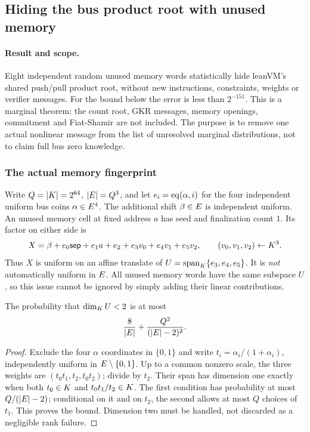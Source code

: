 \subsection{Hiding the bus product root with unused memory}\label{note:zk-bus-root}

\paragraph{Result and scope.} Eight independent random unused memory words statistically hide leanVM's shared push/pull product root, without new instructions, constraints, weights or verifier messages. For the bound below the error is less than $2^{-151}$. This is a marginal theorem: the count root, GKR messages, memory openings, commitment and Fiat-Shamir are not included. The purpose is to remove one actual nonlinear message from the list of unresolved marginal distributions, not to claim full bus zero knowledge.

\subsubsection{The actual memory fingerprint}

Write $Q=|K|=2^{64}$, $|E|=Q^3$, and let $e_i=\operatorname{eq}(\alpha,i)$ for the four independent uniform bus coins $\alpha\in E^4$. The additional shift $\beta\in E$ is independent uniform. An unused memory cell at fixed address $a$ has seed and finalization count $1$. Its factor on either side is
\[
 X=\beta+e_0\mathsf{sep}+e_1a+e_2+e_3v_0+e_4v_1+e_5v_2,
 \qquad (v_0,v_1,v_2)\gets K^3.
\]
Thus $X$ is uniform on an affine translate of $U=\operatorname{span}_{K}\{e_3,e_4,e_5\}$. It is \emph{not} automatically uniform in $E$. All unused memory words have the same subspace $U$, so this issue cannot be ignored by simply adding their linear contributions.

\begin{lemma}\label{lem:bus-dim}
The probability that $\dim_{K}U<2$ is at most
\[
 \frac8{|E|}+\frac{Q^2}{(|E|-2)^2}.
\]
\end{lemma}
\begin{proof}
Exclude the four $\alpha$ coordinates in $\{0,1\}$ and write $t_i=\alpha_i/(1+\alpha_i)$, independently uniform in $E\setminus\{0,1\}$. Up to a common nonzero scale, the three weights are $(t_0t_1,t_2,t_0t_2)$; divide by $t_2$. Their span has dimension one exactly when both $t_0\in K$ and $t_0t_1/t_2\in K$. The first condition has probability at most $Q/(|E|-2)$; conditional on it and on $t_2$, the second allows at most $Q$ choices of $t_1$. This proves the bound. Dimension two must be handled, not discarded as a negligible rank failure.
\end{proof}

